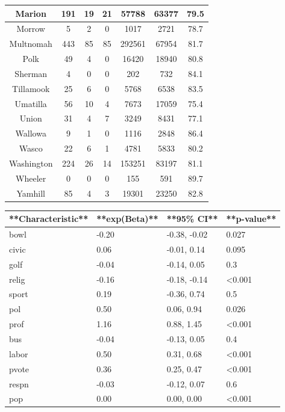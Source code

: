 \documentclass[
  english,
  man]{apa6}
\begin{document}
\begin{table}
\begin{tabular}[t]{c|c|c|c|c|c|c}
\hline
Marion & 191 & 19 & 21 & 57788 & 63377 & 79.5\\
\hline
Morrow & 5 & 2 & 0 & 1017 & 2721 & 78.7\\
\hline
Multnomah & 443 & 85 & 85 & 292561 & 67954 & 81.7\\
\hline
Polk & 49 & 4 & 0 & 16420 & 18940 & 80.8\\
\hline
Sherman & 4 & 0 & 0 & 202 & 732 & 84.1\\
\hline
Tillamook & 25 & 6 & 0 & 5768 & 6538 & 83.5\\
\hline
Umatilla & 56 & 10 & 4 & 7673 & 17059 & 75.4\\
\hline
Union & 31 & 4 & 7 & 3249 & 8431 & 77.1\\
\hline
Wallowa & 9 & 1 & 0 & 1116 & 2848 & 86.4\\
\hline
Wasco & 22 & 6 & 1 & 4781 & 5833 & 80.2\\
\hline
Washington & 224 & 26 & 14 & 153251 & 83197 & 81.1\\
\hline
Wheeler & 0 & 0 & 0 & 155 & 591 & 89.7\\
\hline
Yamhill & 85 & 4 & 3 & 19301 & 23250 & 82.8\\
\hline
\end{tabular}
\end{table}

\begin{tabular}{l|l|l|l}
\hline
**Characteristic** & **exp(Beta)** & **95\% CI** & **p-value**\\
\hline
bowl & -0.20 & -0.38, -0.02 & 0.027\\
\hline
civic & 0.06 & -0.01, 0.14 & 0.095\\
\hline
golf & -0.04 & -0.14, 0.05 & 0.3\\
\hline
relig & -0.16 & -0.18, -0.14 & <0.001\\
\hline
sport & 0.19 & -0.36, 0.74 & 0.5\\
\hline
pol & 0.50 & 0.06, 0.94 & 0.026\\
\hline
prof & 1.16 & 0.88, 1.45 & <0.001\\
\hline
bus & -0.04 & -0.13, 0.05 & 0.4\\
\hline
labor & 0.50 & 0.31, 0.68 & <0.001\\
\hline
pvote & 0.36 & 0.25, 0.47 & <0.001\\
\hline
respn & -0.03 & -0.12, 0.07 & 0.6\\
\hline
pop & 0.00 & 0.00, 0.00 & <0.001\\
\hline
\end{tabular}
\end{document}
